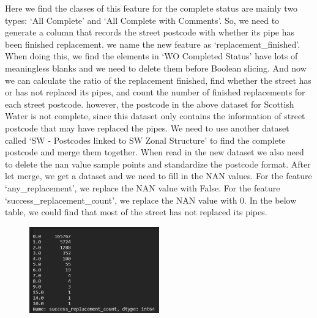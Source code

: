 \documentclass[11pt,twoside]{article}
\numberwithin{Theorem}{section}
\numberwithin{Definition}{section}
\numberwithin{Lemma}{section}
\numberwithin{Algorithm}{section}
\numberwithin{equation}{section}
\begin{document}
Here we find the classes of this feature for the complete status are mainly two types: ‘All Complete’ and ‘All Complete with Comments’. So, we need to generate a column that records the street postcode with whether its pipe has been finished replacement. we name the new feature as ‘replacement\_finished’. When doing this, we find the elements in ‘WO Completed Status’ have lots of meaningless blanks and we need to delete them before Boolean slicing. And now we can calculate the ratio of the replacement finished, find whether the street has or has not replaced its pipes, and count the number of finished replacements for each street postcode. however, the postcode in the above dataset for Scottish Water is not complete, since this dataset only contains the information of street postcode that may have replaced the pipes. We need to use another dataset called ‘SW - Postcodes linked to SW Zonal Structure’ to find the complete postcode and merge them together. When read in the new dataset we also need to delete the nan value sample points and standardize the postcode format. After let merge, we get a dataset and we need to fill in the NAN values. For the feature ‘any\_replacement’, we replace the NAN value with False. For the feature ‘success\_replacement\_count’, we replace the NAN value with 0. In the below table, we could find that most of the street has not replaced its pipes. 

\begin{figure}[!ht]
    \centering
    \includegraphics[width=0.5\textwidth]{p11.png}
    \end{figure}

\clearpage



\clearpage
\end{document}

